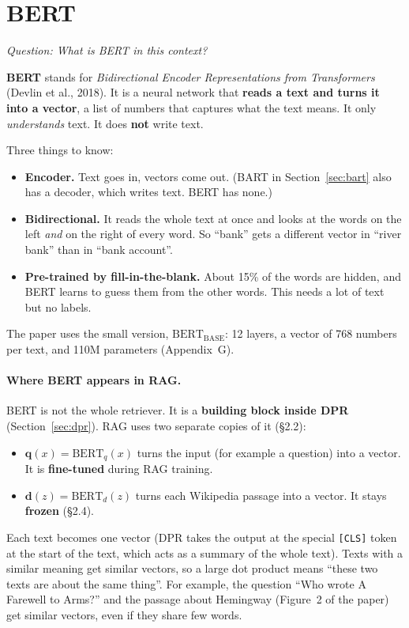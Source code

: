 \documentclass[11pt]{article}
\newcommand{\question}[1]{\noindent\textit{Question: #1}\par\medskip}
\begin{document}
\section{BERT}\label{sec:bert}
\question{What is BERT in this context?}

\textbf{BERT} stands for \emph{Bidirectional Encoder Representations from Transformers} (Devlin et al., 2018). It is a neural network that \textbf{reads a text and turns it into a vector}, a list of numbers that captures what the text means. It only \emph{understands} text. It does \textbf{not} write text.

Three things to know:
\begin{itemize}[nosep]
  \item \textbf{Encoder.} Text goes in, vectors come out. (BART in Section~\ref{sec:bart} also has a decoder, which writes text. BERT has none.)
  \item \textbf{Bidirectional.} It reads the whole text at once and looks at the words on the left \emph{and} on the right of every word. So ``bank'' gets a different vector in ``river bank'' than in ``bank account''.
  \item \textbf{Pre-trained by fill-in-the-blank.} About 15\% of the words are hidden, and BERT learns to guess them from the other words. This needs a lot of text but no labels.
\end{itemize}
The paper uses the small version, $\text{BERT}_{\text{BASE}}$: 12 layers, a vector of 768 numbers per text, and 110M parameters (Appendix~G).

\paragraph{Where BERT appears in RAG.}
BERT is not the whole retriever. It is a \textbf{building block inside DPR} (Section~\ref{sec:dpr}). RAG uses two separate copies of it (\S2.2):
\begin{itemize}[nosep]
  \item $\mathbf{q}(x) = \mathrm{BERT}_q(x)$ turns the input (for example a question) into a vector. It is \textbf{fine-tuned} during RAG training.
  \item $\mathbf{d}(z) = \mathrm{BERT}_d(z)$ turns each Wikipedia passage into a vector. It stays \textbf{frozen} (\S2.4).
\end{itemize}
Each text becomes one vector (DPR takes the output at the special \texttt{[CLS]} token at the start of the text, which acts as a summary of the whole text). Texts with a similar meaning get similar vectors, so a large dot product means ``these two texts are about the same thing''. For example, the question ``Who wrote A Farewell to Arms?'' and the passage about Hemingway (Figure~2 of the paper) get similar vectors, even if they share few words.
\end{document}
